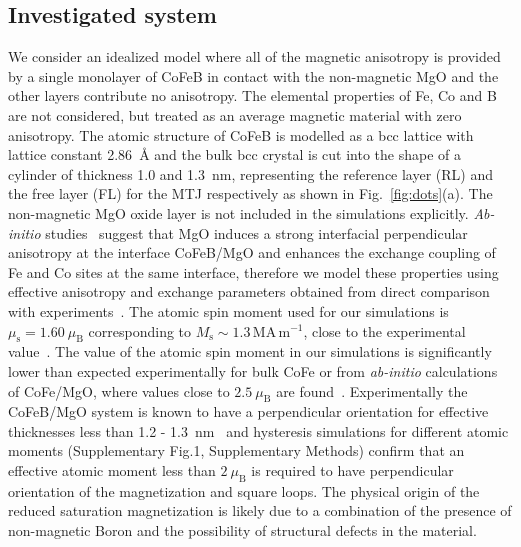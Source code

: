 \documentclass[aps,prb,signlecolumn,preprint,superscriptaddress,10]{revtex4-1}
\newcommand{\smmu}{\ensuremath{\mu_{\mathrm{s}}}\xspace}
\newcommand{\muB}{\ensuremath{\mu_{\mathrm{B}}}\xspace}
\newcommand{\Mags}{\ensuremath{M_{\mathrm{s}}}\xspace}
\newcommand{\Ang}{\textup{\AA}\xspace} %
\begin{document}
\subsection*{Investigated system}
We consider an idealized model where all of the magnetic anisotropy is provided by a single monolayer of CoFeB in contact with the non-magnetic MgO and the other layers contribute no anisotropy. The elemental properties of Fe, Co and B are not considered, but treated as an average magnetic material with zero anisotropy. The atomic structure of CoFeB is modelled as a bcc lattice with lattice constant 2.86~\Ang and the bulk bcc crystal is cut into the shape of a cylinder of thickness 1.0 and 1.3~nm, representing the reference layer (RL) and the free layer (FL) for the MTJ respectively as shown in Fig.~\ref{fig:dots}(a).
The non-magnetic MgO oxide layer is not included in the simulations explicitly. \textit{Ab-initio} studies~\cite{Yang2011,Turek2003} suggest that MgO induces a strong interfacial perpendicular anisotropy at the interface CoFeB/MgO and enhances the exchange coupling of Fe and Co sites at the same interface, therefore we model these properties using effective anisotropy and exchange parameters obtained from direct comparison with experiments~\cite{sato2016}.  
The atomic spin moment used for our simulations is $\smmu = 1.60~\muB$ corresponding to $\Mags \sim 1.3\, \mathrm{MA}\,\mathrm{m}^{-1}$, close to the experimental value~\cite{ikeda}. The value of the atomic spin moment in our simulations is significantly lower than expected experimentally for bulk CoFe or from \textit{ab-initio} calculations of CoFe/MgO, where values close to $2.5~\muB$ are found~\cite{:/content/aip/journal/apl/90/8/10.1063/1.2710181,Bose2016}. Experimentally the CoFeB/MgO system is known to have a perpendicular orientation for effective thicknesses less than 1.2 - 1.3~nm~\cite{ikeda,:/content/aip/journal/apl/107/15/10.1063/1.4933256,C5NR01140J,:/content/aip/journal/adva/2/4/10.1063/1.4771996,PhysRevB.90.184409,:/content/aip/journal/apl/102/24/10.1063/1.4811269,:/content/aip/journal/apl/105/22/10.1063/1.4903296,:/content/aip/journal/apl/106/26/10.1063/1.4923272} and hysteresis simulations for different atomic moments (Supplementary Fig.1, Supplementary Methods) confirm that an effective atomic moment less than $2~\muB$ is required to have perpendicular orientation of the magnetization and square loops. The physical origin of the reduced saturation magnetization is likely due to a combination of the presence of non-magnetic Boron and the possibility of structural defects in the material. 
\end{document}
